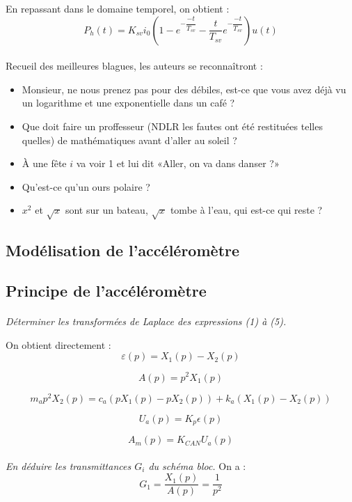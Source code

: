 \documentclass[10pt,oneside]{article}
\begin{document}
En repassant dans le domaine temporel, on obtient :
$$
P_h(t) = K_{sv} i_0 \left( 
1-e^{-\dfrac{-t}{T_{sv}}}
-\dfrac{t}{T_{sv}}e^{-\dfrac{-t}{T_{sv}}}
\right) u(t)
$$
\paragraph{}
Recueil des meilleures blagues, les auteurs se reconnaîtront :
\begin{itemize}
 \item Monsieur, ne nous prenez pas pour des débiles, est-ce que vous avez déjà
vu un logarithme et une exponentielle dans un café ?
\item Que doit faire un proffesseur (NDLR les fautes ont été restituées telles
quelles) de mathématiques avant d'aller au soleil ?
\item À une fête $i$ va voir 1 et lui dit «Aller, on va dans danser ?»
\item Qu'est-ce qu'un ours polaire ?
\item $x^2$ et $\sqrt{x}$ sont sur un bateau, $\sqrt{x}$ tombe à l'eau, qui
est-ce qui reste ?
\end{itemize}

\subsection{Modélisation de l'accéléromètre}

\subsection*{Principe de l’accéléromètre}

\paragraph{}
\textit{Déterminer les transformées de Laplace des expressions (1) à (5).}

On obtient directement : 
$$
\varepsilon(p)=X_1(p)-X_2(p)
$$

$$
A(p)=p^2 X_1(p)
$$

$$
m_a p^2 X_2(p)=c_a \left( pX_1(p) - pX_2(p)\right)+k_a\left( X_1(p)
-X_2(p) \right)
$$

$$
U_a(p)=K_p \epsilon(p)
$$

$$
A_m(p)=K_{CAN} U_a(p)
$$
\paragraph{}
\textit{En déduire les transmittances $G_i$ du schéma bloc.}
On a : 
$$
G_1 = \dfrac{X_1(p)}{A(p)}=\dfrac{1}{p^2}
$$
\end{document}
